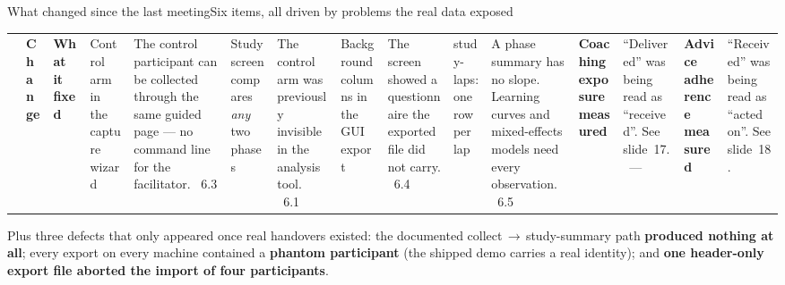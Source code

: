 \documentclass[aspectratio=169,10pt]{beamer}
\newcommand{\kw}[1]{\textcolor{cblue}{\textbf{#1}}}
\newcommand{\code}[1]{{\ttfamily\small #1}}
\begin{document}
\begin{frame}{What changed since the last meeting}{Six items, all driven by problems the real data exposed}
  \vspace{-0.2em}
  \begin{center}\footnotesize
  \begin{tabular}{@{}L{0.9cm}L{5.6cm}L{7.4cm}@{}}
    \toprule
    & \textbf{Change} & \textbf{What it fixed} \
     & Control arm in the capture wizard &
      The control participant can be collected through the same guided page ---
      no command line for the facilitator. \
    6.3 & Study screen compares \emph{any} two phases &
      The control arm was previously invisible in the analysis tool. \
    6.1 & Background columns in the GUI export &
      The screen showed a questionnaire the exported file did not carry. \
    6.4 & \code{study-laps}: one row per lap &
      A phase summary has no slope. Learning curves and mixed-effects models
      need every observation. \
    6.5 & \kw{Coaching exposure measured} &
      ``Delivered'' was being read as ``received''. See slide~17. \
    --- & \kw{Advice adherence measured} &
      ``Received'' was being read as ``acted on''. See slide~18. \
    \bottomrule
  \end{tabular}
  \end{center}
  \vspace{0.3em}
  {\footnotesize Plus three defects that only appeared once real handovers existed:
  the documented \code{collect}\,$\rightarrow$\,\code{study-summary} path
  \kw{produced nothing at all}; every export on every machine contained a
  \kw{phantom participant} (the shipped demo carries a real identity); and
  \kw{one header-only export file aborted the import of four participants}.}
\end{frame}
\end{document}

